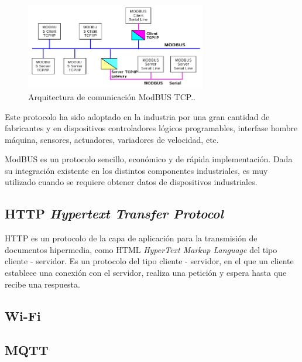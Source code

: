\begin{figure}[htbp]
	\centering
	\includegraphics[width=0.7\textwidth]{./Figures/ModBUS.png}
	\caption{Arquitectura de comunicación ModBUS TCP.\protect\footnotemark.}
	\label{fig:ModBUS}
\end{figure} 

Este protocolo ha sido adoptado en la industria por una gran cantidad de fabricantes y en dispositivos controladores lógicos programables, interfase hombre máquina, sensores, actuadores, variadores de velocidad, etc.

ModBUS es un protocolo sencillo, económico y de rápida implementación. Dada su integración existente en los distintos componentes industriales, es muy utilizado cuando se requiere obtener datos de dispositivos industriales. 

\subsection{HTTP \textit{Hypertext Transfer Protocol}}

HTTP es un protocolo de la capa de aplicación para la transmisión de documentos hipermedia, como HTML \textit{HyperText Markup Language} del tipo cliente - servidor. 
Es un protocolo del tipo cliente - servidor, en el que un cliente establece una conexión con el servidor, realiza una petición y espera hasta que recibe una respuesta.

\subsection{Wi-Fi}

\subsection{MQTT}



